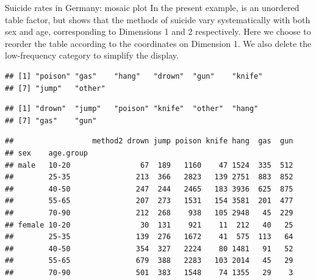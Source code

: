 \documentclass[11pt]{book}
\renewenvironment{knitrout}{\small\renewcommand{\baselinestretch}{.85}}{} %
\begin{document}
\begin{Example}[suicide2]{Suicide rates in Germany: mosaic plot}
In the present example,  is an unordered table factor,
but  shows that the methods of
suicide vary systematically with both sex and age, corresponding
to Dimensions 1 and 2 respectively.  Here we choose to reorder the
table according to the coordinates on Dimension 1. We also delete
the low-frequency  category to simplify the display.
\begin{knitrout}
\color{fgcolor}\begin{kframe}
\begin{alltt}
\hlopt{$}
\end{alltt}
\begin{verbatim}
## [1] "poison" "gas"    "hang"   "drown"  "gun"    "knife" 
## [7] "jump"   "other"
\end{verbatim}
\begin{alltt}
\hlopt{$}\hlstd{colnames[}\hlopt{$}\hlstd{colcoord[,}\hlstd{])]}
\end{alltt}
\begin{verbatim}
## [1] "drown"  "jump"   "poison" "knife"  "other"  "hang"  
## [7] "gas"    "gun"
\end{verbatim}
\begin{alltt}
 \hlkwb{<-} \hlstd{suicide.tab3[, ,} \hlopt{$}\hlstd{colcoord[,}\hlstd{])]}
 \hlkwb{<-} \hlstd{suicide.tab3[,,} \hlopt{-}\hlstd{]}
\end{alltt}
\begin{verbatim}
##                  method2 drown jump poison knife hang  gas  gun
## sex    age.group                                               
## male   10-20                67  189   1160    47 1524  335  512
##        25-35               213  366   2823   139 2751  883  852
##        40-50               247  244   2465   183 3936  625  875
##        55-65               207  273   1531   154 3581  201  477
##        70-90               212  268    938   105 2948   45  229
## female 10-20                30  131    921    11  212   40   25
##        25-35               139  276   1672    41  575  113   64
##        40-50               354  327   2224    80 1481   91   52
##        55-65               679  388   2283   103 2014   45   29
##        70-90               501  383   1548    74 1355   29    3
\end{verbatim}
\end{kframe}
\end{knitrout}


\end{Example}
\end{document}
